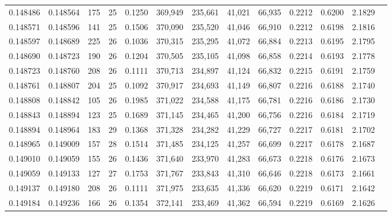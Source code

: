 \begin{tabular}{rrrrrrrrrrrrr}
0.148486 & 0.148564 & 175 &  25 &                                     0.1250 & 369,949 & 235,661 &  41,021 &  66,935 & 0.2212 & 0.6200 & 2.1829 \\
0.148571 & 0.148596 & 141 &  25 &                                     0.1506 & 370,090 & 235,520 &  41,046 &  66,910 & 0.2212 & 0.6198 & 2.1816 \\
0.148597 & 0.148689 & 225 &  26 &                                     0.1036 & 370,315 & 235,295 &  41,072 &  66,884 & 0.2213 & 0.6195 & 2.1795 \\
0.148690 & 0.148723 & 190 &  26 &                                     0.1204 & 370,505 & 235,105 &  41,098 &  66,858 & 0.2214 & 0.6193 & 2.1778 \\
0.148723 & 0.148760 & 208 &  26 &                                     0.1111 & 370,713 & 234,897 &  41,124 &  66,832 & 0.2215 & 0.6191 & 2.1759 \\
0.148761 & 0.148807 & 204 &  25 &                                     0.1092 & 370,917 & 234,693 &  41,149 &  66,807 & 0.2216 & 0.6188 & 2.1740 \\
0.148808 & 0.148842 & 105 &  26 &                                     0.1985 & 371,022 & 234,588 &  41,175 &  66,781 & 0.2216 & 0.6186 & 2.1730 \\
0.148843 & 0.148894 & 123 &  25 &                                     0.1689 & 371,145 & 234,465 &  41,200 &  66,756 & 0.2216 & 0.6184 & 2.1719 \\
0.148894 & 0.148964 & 183 &  29 &                                     0.1368 & 371,328 & 234,282 &  41,229 &  66,727 & 0.2217 & 0.6181 & 2.1702 \\
0.148965 & 0.149009 & 157 &  28 &                                     0.1514 & 371,485 & 234,125 &  41,257 &  66,699 & 0.2217 & 0.6178 & 2.1687 \\
0.149010 & 0.149059 & 155 &  26 &                                     0.1436 & 371,640 & 233,970 &  41,283 &  66,673 & 0.2218 & 0.6176 & 2.1673 \\
0.149059 & 0.149133 & 127 &  27 &                                     0.1753 & 371,767 & 233,843 &  41,310 &  66,646 & 0.2218 & 0.6173 & 2.1661 \\
0.149137 & 0.149180 & 208 &  26 &                                     0.1111 & 371,975 & 233,635 &  41,336 &  66,620 & 0.2219 & 0.6171 & 2.1642 \\
0.149184 & 0.149236 & 166 &  26 &                                     0.1354 & 372,141 & 233,469 &  41,362 &  66,594 & 0.2219 & 0.6169 & 2.1626 \\

\end{tabular}
